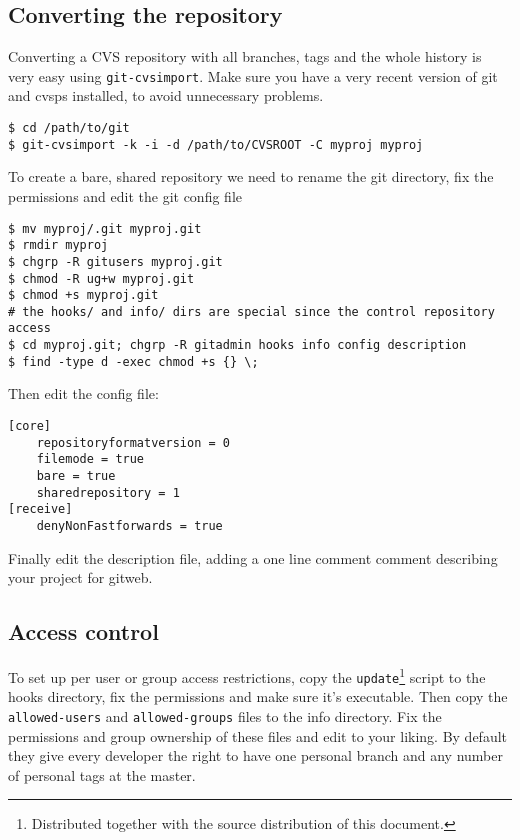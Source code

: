 \documentclass[a4paper,10pt]{article}
\begin{document}
\subsection{Converting the repository}
Converting a CVS repository with all branches, tags and the whole history is
very easy using {\tt git-cvsimport}. 
Make sure you have a very recent version of git and cvsps installed, to avoid
unnecessary problems.  
\begin{verbatim}
$ cd /path/to/git
$ git-cvsimport -k -i -d /path/to/CVSROOT -C myproj myproj
\end{verbatim}
To create a bare, shared repository we need to rename the git directory, fix
the permissions and edit the git config file
\begin{verbatim}
$ mv myproj/.git myproj.git
$ rmdir myproj
$ chgrp -R gitusers myproj.git
$ chmod -R ug+w myproj.git
$ chmod +s myproj.git
# the hooks/ and info/ dirs are special since the control repository access
$ cd myproj.git; chgrp -R gitadmin hooks info config description
$ find -type d -exec chmod +s {} \;
\end{verbatim}
Then edit the config file:
\begin{verbatim}
[core]
	repositoryformatversion = 0
	filemode = true
	bare = true
	sharedrepository = 1
[receive]
	denyNonFastforwards = true
\end{verbatim}
Finally edit the description file, adding a one line comment comment
describing your project for gitweb.

\subsection{Access control}
To set up per user or group access restrictions, copy the
\texttt{update}\footnote{Distributed together with the source distribution of
this document.}
script to the hooks directory, fix the permissions and make sure it's
executable. Then copy the \texttt{allowed-users} and \texttt{allowed-groups}
files to the info directory. Fix the permissions and group ownership of these
files and edit to your liking. By default they give every developer the right
to have one personal branch and any number of personal tags at the master.
\end{document}
